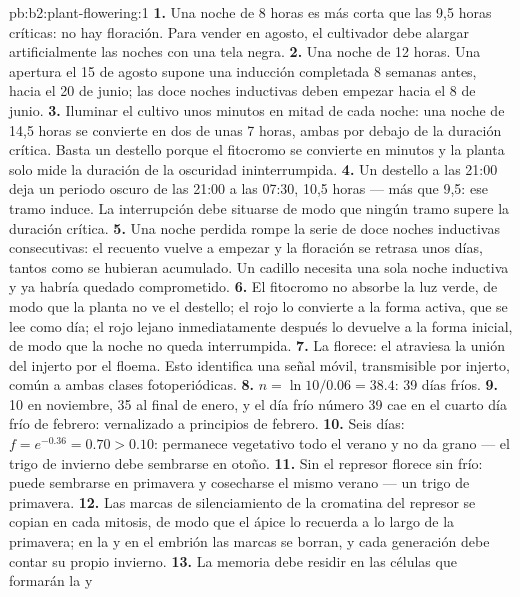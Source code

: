 \begin{solution}{pb:b2:plant-flowering:1}
\textbf{1.} Una noche de 8 horas es más corta que las 9,5 horas
críticas: no hay floración. Para vender en agosto, el cultivador debe
alargar artificialmente las noches con una tela negra.
\textbf{2.} Una noche de 12 horas. Una apertura el 15 de agosto supone una
inducción completada 8 semanas antes, hacia el 20 de junio; las doce
noches inductivas deben empezar hacia el 8 de junio.
\textbf{3.} Iluminar el cultivo unos minutos en mitad de cada noche: una
noche de 14,5 horas se convierte en dos de unas 7 horas, ambas por debajo
de la duración crítica. Basta un destello porque el fitocromo se
convierte en minutos y la planta solo mide la duración de la oscuridad
ininterrumpida.
\textbf{4.} Un destello a las 21:00 deja un periodo oscuro de las 21:00 a
las 07:30, 10,5 horas --- más que 9,5: ese tramo induce. La interrupción
debe situarse de modo que ningún tramo supere la duración crítica.
\textbf{5.} Una noche perdida rompe la serie de doce noches inductivas
consecutivas: el recuento vuelve a empezar y la floración se retrasa unos
días, tantos como se hubieran acumulado. Un cadillo necesita una sola
noche inductiva y ya habría quedado comprometido.
\textbf{6.} El fitocromo no absorbe la luz verde, de modo que la planta no
ve el destello; el rojo lo convierte a la forma activa, que se lee como
día; el rojo lejano inmediatamente después lo devuelve a la forma
inicial, de modo que la noche no queda interrumpida.
\textbf{7.} La  florece: el  atraviesa la unión
del injerto por el floema. Esto identifica una señal móvil, transmisible
por injerto, común a ambas clases fotoperiódicas.
\textbf{8.} $n = \ln 10/0.06 = 38.4$: 39 días fríos.
\textbf{9.} 10 en noviembre, 35 al final de enero, y el día frío número 39
cae en el cuarto día frío de febrero: vernalizado a principios de
febrero.
\textbf{10.} Seis días: $f = e^{-0.36} = 0.70 > 0.10$: permanece vegetativo
todo el verano y no da grano --- el trigo de invierno debe sembrarse en
otoño.
\textbf{11.} Sin el represor florece sin frío: puede sembrarse en
primavera y cosecharse el mismo verano --- un trigo de primavera.
\textbf{12.} Las marcas de silenciamiento de la cromatina del represor se
copian en cada mitosis, de modo que el ápice lo recuerda a lo largo de la
primavera; en la  y en el embrión las marcas se borran, y cada
generación debe contar su propio invierno.
\textbf{13.} La memoria debe residir en las células que formarán la  y

\end{solution}
